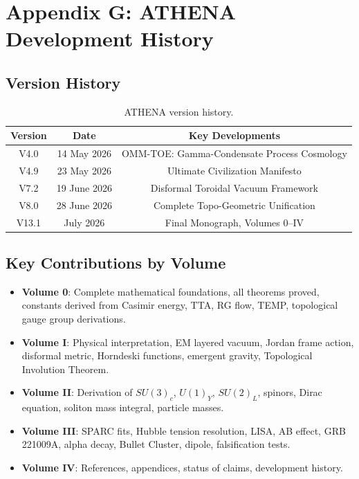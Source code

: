 \documentclass[12pt,oneside]{book}
\begin{document}
\chapter{Appendix G: ATHENA Development History}

\section{Version History}

\begin{table}[H]
\centering
\begin{tabular}{|c|c|c|}
\hline
\textbf{Version} & \textbf{Date} & \textbf{Key Developments} \\
\hline
V4.0 & 14 May 2026 & OMM-TOE: Gamma-Condensate Process Cosmology \\
V4.9 & 23 May 2026 & Ultimate Civilization Manifesto \\
V7.2 & 19 June 2026 & Disformal Toroidal Vacuum Framework \\
V8.0 & 28 June 2026 & Complete Topo-Geometric Unification \\
V13.1 & July 2026 & Final Monograph, Volumes 0--IV \\
\hline
\end{tabular}
\caption{ATHENA version history.}
\end{table}

\section{Key Contributions by Volume}

\begin{itemize}
    \item \textbf{Volume 0}: Complete mathematical foundations, all theorems proved, constants derived from Casimir energy, TTA, RG flow, TEMP, topological gauge group derivations.
    \item \textbf{Volume I}: Physical interpretation, EM layered vacuum, Jordan frame action, disformal metric, Horndeski functions, emergent gravity, Topological Involution Theorem.
    \item \textbf{Volume II}: Derivation of $SU(3)_c$, $U(1)_Y$, $SU(2)_L$, spinors, Dirac equation, soliton mass integral, particle masses.
    \item \textbf{Volume III}: SPARC fits, Hubble tension resolution, LISA, AB effect, GRB 221009A, alpha decay, Bullet Cluster, dipole, falsification tests.
    \item \textbf{Volume IV}: References, appendices, status of claims, development history.
\end{itemize}
\end{document}
